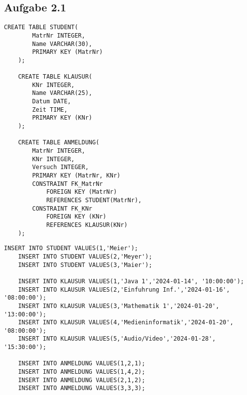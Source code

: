 \subsection{Aufgabe 2.1}
    \begin{lstlisting}[style=sqlstyle, caption={Erstellen der Tabellen STUDENT, KLAUSUR und ANMELDUNG}]
    CREATE TABLE STUDENT(
        MatrNr INTEGER,
        Name VARCHAR(30),
        PRIMARY KEY (MatrNr)
    );

    CREATE TABLE KLAUSUR(
        KNr INTEGER,
        Name VARCHAR(25),
        Datum DATE,
        Zeit TIME,
        PRIMARY KEY (KNr)
    );

    CREATE TABLE ANMELDUNG(
        MatrNr INTEGER,
        KNr INTEGER,
        Versuch INTEGER,
        PRIMARY KEY (MatrNr, KNr)
        CONSTRAINT FK_MatrNr
            FOREIGN KEY (MatrNr)
            REFERENCES STUDENT(MatrNr),
        CONSTRAINT FK_KNr
            FOREIGN KEY (KNr)
            REFERENCES KLAUSUR(KNr)
    );
    \end{lstlisting}
    
    \vspace{1cm}
    \begin{lstlisting}[style=sqlstyle, caption={Einfügen von Datensätzen in die Tabellen STUDENT, KLAUSUR und ANMELDUNG}]
    INSERT INTO STUDENT VALUES(1,'Meier');
    INSERT INTO STUDENT VALUES(2,'Meyer');
    INSERT INTO STUDENT VALUES(3,'Maier');

    INSERT INTO KLAUSUR VALUES(1,'Java 1','2024-01-14', '10:00:00');
    INSERT INTO KLAUSUR VALUES(2,'Einfuhrung Inf.','2024-01-16', '08:00:00');
    INSERT INTO KLAUSUR VALUES(3,'Mathematik 1','2024-01-20', '13:00:00');
    INSERT INTO KLAUSUR VALUES(4,'Medieninformatik','2024-01-20', '08:00:00');
    INSERT INTO KLAUSUR VALUES(5,'Audio/Video','2024-01-28', '15:30:00');

    INSERT INTO ANMELDUNG VALUES(1,2,1);
    INSERT INTO ANMELDUNG VALUES(1,4,2);
    INSERT INTO ANMELDUNG VALUES(2,1,2);
    INSERT INTO ANMELDUNG VALUES(3,3,3);
    \end{lstlisting}

